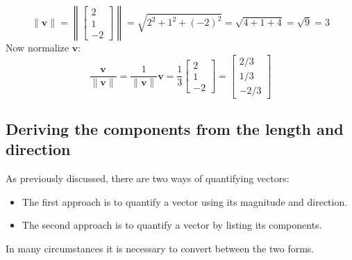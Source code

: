 \documentclass{article}
\begin{document}
\begin{itemize}
\[\|\mathbf{v}\| = \left\|\begin{bmatrix} 2 \\ 1 \\ -2 \end{bmatrix}\right\| = \sqrt{2^2 + 1^2 + (-2)^2} = \sqrt{4 + 1 + 4} = \sqrt{9} = 3\]  
Now normalize \(\mathbf{v}\):
\[\frac{\mathbf{v}}{\|\mathbf{v}\|} 
= \frac{1}{\|\mathbf{v}\|}\mathbf{v}   
= \frac{1}{3}\begin{bmatrix} 2 \\ 1 \\ -2 \end{bmatrix}
= \begin{bmatrix} 2/3 \\ 1/3 \\ -2/3 \end{bmatrix}\]
\end{itemize}




\subsection*{Deriving the components from the length and direction}

As previously discussed, there are two ways of quantifying vectors: 
\begin{itemize}
\item The first approach is to quantify a vector using its magnitude and direction. 
\item The second approach is to quantify a vector by listing its components. 
\end{itemize}
In many circumstances it is necessary to convert between the two forms.
\end{document}
